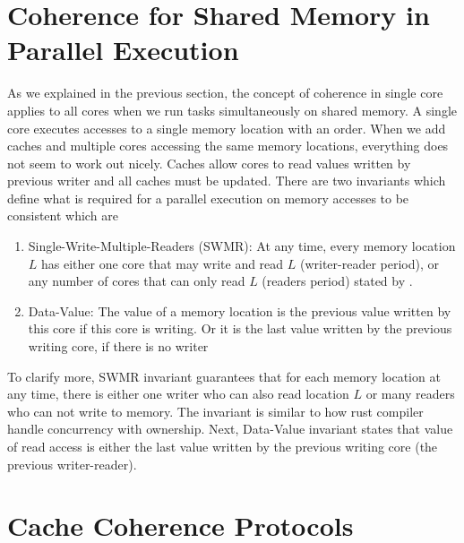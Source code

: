 \section{Coherence for Shared Memory in Parallel Execution}
As we explained in the previous section, the concept of coherence in single core applies to all cores when we run tasks
simultaneously on shared memory. A single core executes accesses to a single memory location with an order. When we add caches and multiple cores accessing the same memory locations,
everything does not seem to work out nicely. Caches allow cores to read values written by previous writer and all caches must be updated.
There are two invariants which define what is required for a parallel execution on memory accesses to be consistent which are 
\begin{enumerate}
        \item Single-Write-Multiple-Readers (SWMR): At any time, every memory location $L$  has either one core that may write and read $L$ (writer-reader period), or any number of cores that can only read $L$ (readers period) stated by \cite{hay2012mesif}.
        \item Data-Value: The value of a memory location is the previous value written by this core if this core is writing. Or it is the last value written by the previous writing core, 
                if there is no writer
\end{enumerate}
To clarify more, SWMR invariant guarantees that for each memory location at any time, there is either one writer who can also read location $L$ or many readers who can not write to memory.
The invariant is similar to how rust compiler handle concurrency with ownership. Next, Data-Value invariant states that value of read access
is either the last value written by the previous writing core (the previous writer-reader).

\section{Cache Coherence Protocols}

